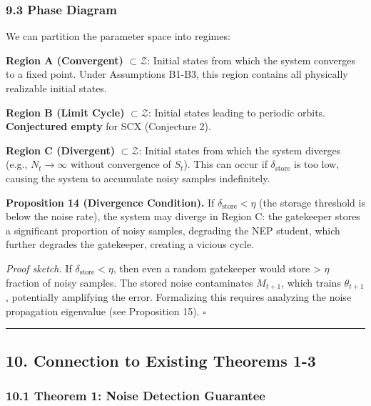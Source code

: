 \documentclass[
  12pt,
]{article}
\begin{document}
\subsubsection{9.3 Phase Diagram}\label{phase-diagram}

We can partition the parameter space into regimes:

\textbf{Region A (Convergent)} \(\subset \mathcal{Z}\): Initial states
from which the system converges to a fixed point. Under Assumptions
B1-B3, this region contains all physically realizable initial states.

\textbf{Region B (Limit Cycle)} \(\subset \mathcal{Z}\): Initial states
leading to periodic orbits. \textbf{Conjectured empty} for SCX
(Conjecture 2).

\textbf{Region C (Divergent)} \(\subset \mathcal{Z}\): Initial states
from which the system diverges (e.g., \(N_t \to \infty\) without
convergence of \(S_t\)). This can occur if \(\delta_{\text{store}}\) is
too low, causing the system to accumulate noisy samples indefinitely.

\textbf{Proposition 14 (Divergence Condition).} If
\(\delta_{\text{store}} < \eta\) (the storage threshold is below the
noise rate), the system may diverge in Region C: the gatekeeper stores a
significant proportion of noisy samples, degrading the NEP student,
which further degrades the gatekeeper, creating a vicious cycle.

\emph{Proof sketch.} If \(\delta_{\text{store}} < \eta\), then even a
random gatekeeper would store \textgreater{} \(\eta\) fraction of noisy
samples. The stored noise contaminates \(M_{t+1}\), which trains
\(\theta_{t+1}\), potentially amplifying the error. Formalizing this
requires analyzing the noise propagation eigenvalue (see Proposition
15). \(\square\)

\begin{center}\rule{0.5\linewidth}{0.5pt}\end{center}

\subsection{10. Connection to Existing Theorems
1-3}\label{connection-to-existing-theorems-1-3}

\subsubsection{10.1 Theorem 1: Noise Detection
Guarantee}\label{theorem-1-noise-detection-guarantee}
\end{document}
